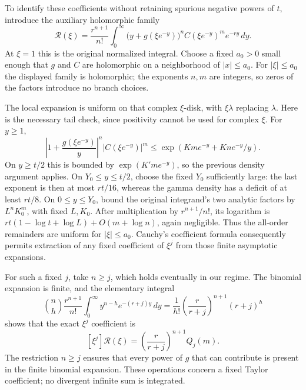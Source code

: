 \documentclass[11pt,a4paper]{article}
\numberwithin{equation}{section}
\theoremstyle{plain}
\theoremstyle{definition}
\theoremstyle{remark}
\begin{document}
To identify these coefficients without retaining spurious negative
powers of $t$, introduce the auxiliary holomorphic family
\[
 \mathcal R(\xi)=\frac{r^{n+1}}{n!}
   \int_0^\infty
      \bigl(y+g(\xi e^{-y})\bigr)^n C(\xi e^{-y})^m e^{-ry}\,dy.
\]
At $\xi=1$ this is the original normalized integral. Choose a fixed
$a_0>0$ small enough that $g$ and $C$ are holomorphic on a
neighborhood of $|x|\leq a_0$. For $|\xi|\leq a_0$ the displayed
family is holomorphic; the exponents $n,m$ are integers, so zeros
of the factors introduce no branch choices.

The local expansion is uniform on that complex $\xi$-disk, with
$\xi\lambda$ replacing $\lambda$. Here is the necessary tail check,
since positivity cannot be used for complex $\xi$. For $y\geq1$,
\[
 \left|1+\frac{g(\xi e^{-y})}{y}\right|^n
       |C(\xi e^{-y})|^m
 \leq\exp\left(Kme^{-y}+Kne^{-y}/y\right).
\]
On $y\geq t/2$ this is bounded by $\exp(K'me^{-y})$, so the
previous density argument applies. On $Y_0\leq y\leq t/2$,
choose the fixed $Y_0$ sufficiently large: the last exponent is
then at most $rt/16$, whereas the gamma density has a deficit of
at least $rt/8$. On $0\leq y\leq Y_0$, bound the original
integrand's two analytic factors by $L^nK_0^m$, with fixed
$L,K_0$. After multiplication by $r^{n+1}/n!$, its logarithm is
$rt(1-\log t+\log L)+O(m+\log n)$, again negligible.
Thus the all-order remainders are uniform for $|\xi|\leq a_0$.
Cauchy's coefficient formula consequently permits extraction of any
fixed coefficient of $\xi^j$ from those finite asymptotic expansions.

For such a fixed $j$, take $n\geq j$, which holds eventually in
our regime. The binomial expansion is finite, and the elementary
integral
\[
 \binom nh\frac{r^{n+1}}{n!}
 \int_0^\infty y^{n-h}e^{-(r+j)y}\,dy
 =\frac1{h!}\left(\frac r{r+j}\right)^{n+1}(r+j)^h
\]
shows that the exact $\xi^j$ coefficient is
\begin{equation}\label{joint:eq:coefficient-integration}
 [\xi^j]\mathcal R(\xi)
   =\left(\frac r{r+j}\right)^{n+1}Q_j(m).
\end{equation}
The restriction $n\geq j$ ensures that every power of $g$ that can
contribute is present in the finite binomial expansion.
These operations concern a fixed Taylor coefficient; no divergent
infinite sum is integrated.
\end{document}
